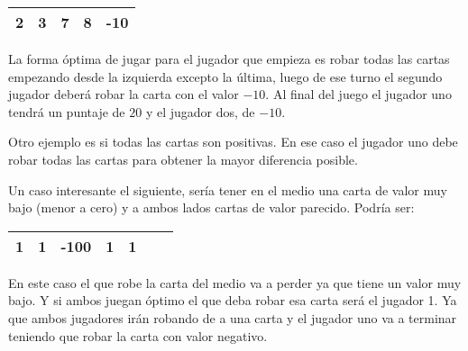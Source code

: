 \begin{center}
\begin{tabular}{|c|c|c|c|c|}
\hline
2 & 3 & 7 & 8 & -10 \\
\hline
\end{tabular}
\end{center}

La forma óptima de jugar para el jugador que empieza es robar todas las cartas empezando desde la izquierda excepto la última, luego de ese turno el segundo jugador deberá robar la carta con el valor $-10$. Al final del juego el jugador uno tendrá un puntaje de $20$ y el jugador dos, de $-10$.

Otro ejemplo es si todas las cartas son positivas. En ese caso el jugador uno debe robar todas las cartas para obtener la mayor diferencia posible.

Un caso interesante el siguiente, sería tener en el medio una carta de valor muy bajo (menor a cero) y a ambos lados cartas de valor parecido. Podría ser:

\begin{center}
\begin{tabular}{|c|c|c|c|c|c|c|}
\hline
1 & 1 & -100 & 1 & 1 \\
\hline
\end{tabular}
\end{center}

En este caso el que robe la carta del medio va a perder ya que tiene un valor muy bajo. Y si ambos juegan óptimo el que deba robar esa carta será el jugador 1. Ya que ambos jugadores irán robando de a una carta y el jugador uno va a terminar teniendo que robar la carta con valor negativo.